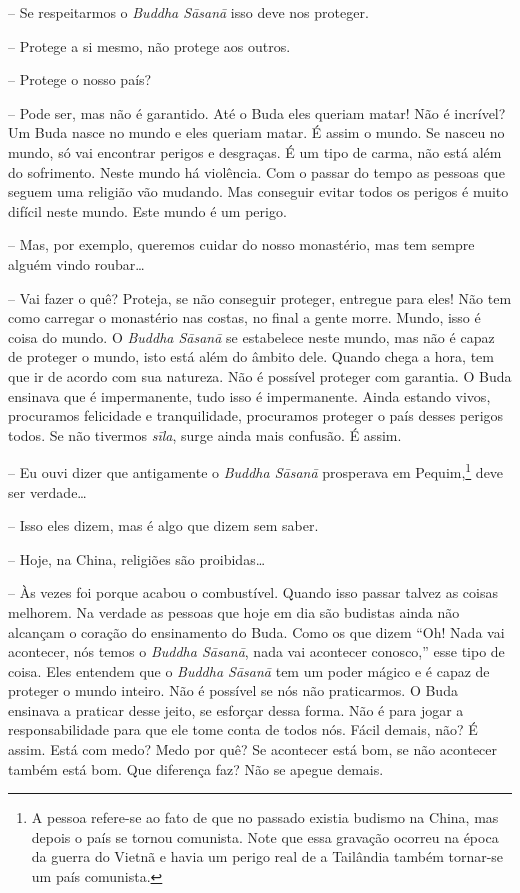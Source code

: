 -- Se respeitarmos o \emph{Buddha Sāsanā} isso deve nos
proteger.

-- Protege a si mesmo, não protege aos outros.

-- Protege o nosso país?

-- Pode ser, mas não é garantido. Até o Buda eles queriam matar!
Não é incrível? Um Buda nasce no mundo e eles queriam matar. É assim o
mundo. Se nasceu no mundo, só vai encontrar perigos e desgraças. É um
tipo de carma, não está além do sofrimento. Neste mundo há violência.
Com o passar do tempo as pessoas que seguem uma religião vão mudando.
Mas conseguir evitar todos os perigos é muito difícil neste mundo. Este
mundo é um perigo.

-- Mas, por exemplo, queremos cuidar do nosso monastério, mas tem
sempre alguém vindo roubar\ldots{}

-- Vai fazer o quê? Proteja, se não conseguir proteger, entregue
para eles! Não tem como carregar o monastério nas costas, no final a
gente morre. Mundo, isso é coisa do mundo. O \emph{Buddha Sāsanā}
se estabelece neste mundo, mas não é capaz de proteger o mundo, isto
está além do âmbito dele. Quando chega a hora, tem que ir de acordo com
sua natureza. Não é possível proteger com garantia. O Buda ensinava que
é impermanente, tudo isso é impermanente. Ainda estando vivos,
procuramos felicidade e tranquilidade, procuramos proteger o país
desses perigos todos. Se não tivermos \emph{sīla}, surge ainda
mais confusão. É assim.

-- Eu ouvi dizer que antigamente o \emph{Buddha Sāsanā
}prosperava em Pequim,\footnote{A pessoa refere-se ao fato de que no
passado existia budismo na China, mas depois o país se tornou
comunista. Note que essa gravação ocorreu na época da guerra do Vietnã
e havia um perigo real de a Tailândia também tornar-se um país
comunista.} deve ser verdade\ldots{}

-- Isso eles dizem, mas é algo que dizem sem saber.

-- Hoje, na China, religiões são proibidas\ldots{}

-- Às vezes foi porque acabou o combustível. Quando isso passar
talvez as coisas melhorem. Na verdade as pessoas que hoje em dia são
budistas ainda não alcançam o coração do ensinamento do Buda. Como os
que dizem “Oh! Nada vai acontecer, nós temos o \emph{Buddha
Sāsanā}, nada vai acontecer conosco,” esse tipo de coisa. Eles
entendem que o \emph{Buddha Sāsanā} tem um poder mágico e é capaz
de proteger o mundo inteiro. Não é possível se nós não praticarmos. O
Buda ensinava a praticar desse jeito, se esforçar dessa forma. Não é
para jogar a responsabilidade para que ele tome conta de todos nós.
Fácil demais, não? É assim. Está com medo? Medo por quê? Se acontecer
está bom, se não acontecer também está bom. Que diferença faz? Não se
apegue demais.

